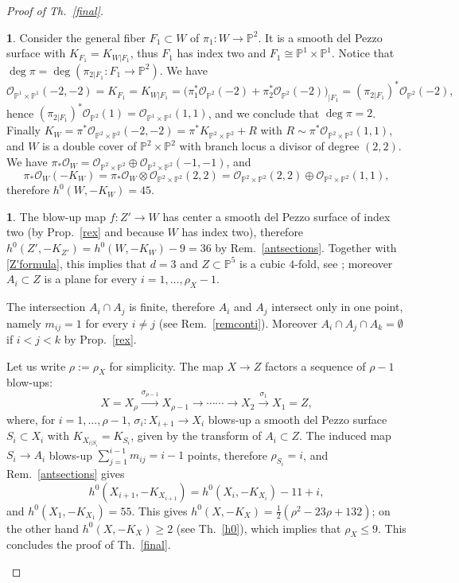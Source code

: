 \documentclass[a4paper,12pt]{amsart}
\theoremstyle{definition}
\newtheorem{prg}[thm]{}
\numberwithin{figure}{section}
\numberwithin{table}{section}
\newcommand{\la}{\longrightarrow}
\newcommand{\ol}{\mathcal{O}}
\newcommand{\pr}{\mathbb{P}}
\begin{document}
\begin{proof}[Proof of Th.~\ref{final}]
\begin{prg}
 Consider the general fiber $F_1\subset W$ of $\pi_1\colon W\to\pr^2$. It is a smooth del Pezzo surface with $K_{F_1}=K_{W|F_1}$, thus $F_1$ has index two and $F_1\cong\pr^1\times\pr^1$. Notice that $\deg\pi=\deg(\pi_{2|F_1}\colon F_1\to\pr^2)$. We have
 $$\ol_{\pr^1\times\pr^1}(-2,-2)=K_{F_1}=K_{W|F_1}=\bigl(\pi_1^*\ol_{\pr^2}(-2)+
 \pi_2^*\ol_{\pr^2}(-2)\bigr)_{|F_1}=(\pi_{2|F_1})^*\ol_{\pr^2}(-2),$$
 hence $(\pi_{2|F_1})^*\ol_{\pr^2}(1)=\ol_{\pr^1\times\pr^1}(1,1)$, and we conclude that $\deg \pi=2$. Finally $K_W=\pi^*\ol_{\pr^2\times\pr^2}(-2,-2)=\pi^*K_{\pr^2\times\pr^2}+R$ with $R\sim\pi^*\ol_{\pr^2\times\pr^2}(1,1)$, and
 $W$ is a double cover of $\pr^2\times\pr^2$ with branch locus a divisor of degree $(2,2)$.
We have  $\pi_*\ol_W=\ol_{\pr^2\times\pr^2}\oplus\ol_{\pr^2\times\pr^2}(-1,-1)$, and $$\pi_*\ol_W(-K_W)=\pi_*\ol_W\otimes\ol_{\pr^2\times\pr^2}(2,2)=\ol_{\pr^2\times\pr^2}(2,2)\oplus\ol_{\pr^2\times\pr^2}(1,1),$$
therefore $h^0(W,-K_W)=45$.
\end{prg}
\begin{prg}\label{atene}
  The blow-up map $f\colon Z'\to W$ has center a smooth del Pezzo surface of index two (by Prop.~\ref{rex} and because $W$ has index two), therefore $h^0(Z',-K_{Z'})=h^0(W,-K_W)-9=36$ by Rem.~\ref{antsections}.
Together with \eqref{Z'formula}, this implies that $d=3$ and $Z\subset \pr^5$ is a cubic $4$-fold, see \cite[Th.~3.3.1]{fanoEMS}; moreover $A_i\subset Z$ is a plane for every $i=1,\dotsc,\rho_X-1$.

The intersection $A_i\cap A_j$ is finite, therefore  $A_i$ and $A_j$ intersect only in one point, namely $m_{ij}=1$ for every $i\neq j$ (see Rem.~\ref{remconti}).
Moreover $A_i\cap A_j\cap A_k=\emptyset$ if $i<j<k$ by Prop.~\ref{rex}.

Let us write $\rho:=\rho_X$ for simplicity.
 The map $X\to Z$ factors a sequence of $\rho-1$ blow-ups:
 $$X=X_\rho\stackrel{\sigma_{\rho-1}}{\la}X_{\rho-1}{\la}\cdots\cdots
 {\la} 
 X_{2}\stackrel{\sigma_{1}}{\la} X_{1}=Z,$$
 where, for $i=1,\dotsc,\rho-1$, $\sigma_{i}\colon X_{i+1}\to X_{i}$ blows-up a smooth del Pezzo surface $S_i\subset X_i$  with $K_{X_{i|S_i}}=K_{S_i}$, given by the transform of $A_i\subset Z$. The induced map $S_i\to A_i$ blows-up $\sum_{j=1}^{i-1}m_{ij}=i-1$ points, therefore $\rho_{S_i}=i$, and
 Rem.~\ref{antsections} gives $$h^0(X_{i+1},-K_{X_{i+1}})
=h^0(X_{i},-K_{X_{i}})-11+i,$$
 and $h^0(X_{1},-K_{X_{1}})=55$.
 This gives $h^0(X,-K_X)=\frac{1}{2}(\rho^2-23\rho+132)$; on the other hand $h^0(X,-K_X)\geq 2$ (see  Th.~\ref{h0}), which implies that $\rho_X\leq 9$. This concludes the proof of Th.~\ref{final}.\qedhere
\end{prg}
\end{proof}
\end{document}
